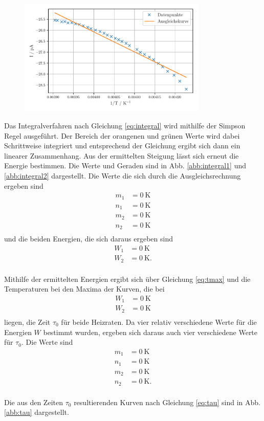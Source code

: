 \begin{figure}
    \centering
    \includegraphics[width=0.8\textwidth]{figures/anlauf2.pdf}
    \caption{}
    \label{abb:anlauf2}
\end{figure}

Das Integralverfahren nach Gleichung \eqref{eq:integral} wird mithilfe der Simpson Regel ausgeführt. Der Bereich der orangenen und grünen Werte wird dabei Schrittweise integriert und entsprechend der Gleichung ergibt sich dann ein linearer Zusammenhang.
Aus der ermittelten Steigung lässt sich erneut die Energie bestimmen. Die Werte und Geraden sind in Abb. \ref{abb:integral1} und \ref{abb:integral2} dargestellt. Die Werte die sich durch die Ausgleichsrechnung ergeben sind 
\begin{align*}
    m_{1} &= \SI{0}{\kelvin} \\
    n_{1} &= \SI{0}{\kelvin} \\
    m_{2} &= \SI{0}{\kelvin} \\
    n_{2} &= \SI{0}{\kelvin} \\
\end{align*}
und die beiden Energien, die sich daraus ergeben sind 
\begin{align*}
    W_{1} &= \SI{0}{\kelvin} \\
    W_{2} &= \SI{0}{\kelvin}. \\
\end{align*}

Mithilfe der ermittelten Energien ergibt sich über Gleichung \eqref{eq:tmax} und die Temperaturen bei den Maxima der Kurven, die bei 
\begin{align*}
    W_{1} &= \SI{0}{\kelvin} \\
    W_{2} &= \SI{0}{\kelvin} \\
\end{align*}
liegen, die Zeit $\tau_0$ für beide Heizraten. Da vier relativ verschiedene Werte für die Energien $W$ bestimmt wurden, ergeben sich daraus auch vier verschiedene Werte für $\tau_0$.
Die Werte sind 
\begin{align*}
    m_{1} &= \SI{0}{\kelvin} \\
    n_{1} &= \SI{0}{\kelvin} \\
    m_{2} &= \SI{0}{\kelvin} \\
    n_{2} &= \SI{0}{\kelvin}. \\
\end{align*}

Die aus den Zeiten $\tau_0$ resultierenden Kurven nach Gleichung \eqref{eq:tau} sind in Abb. \ref{abb:tau} dargestellt.



